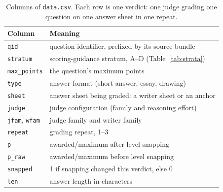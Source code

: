 \documentclass{article}
\begin{document}
\begin{table}[!ht]
\centering\small
\caption{Columns of \texttt{data.csv}. Each row is one verdict: one judge
grading one question on one answer sheet in one repeat.}
\label{tab:columns}
\begin{tabular}{@{}ll@{}}
\toprule
\textbf{Column} & \textbf{Meaning} \\
\midrule
\texttt{qid} & question identifier, prefixed by its source bundle \\
\texttt{stratum} & scoring-guidance stratum, A--D (Table~\ref{tab:strata}) \\
\texttt{max\_points} & the question's maximum points \\
\texttt{type} & answer format (short answer, essay, drawing) \\
\texttt{sheet} & answer sheet being graded: a writer sheet or an anchor \\
\texttt{judge} & judge configuration (family and reasoning effort) \\
\texttt{jfam}, \texttt{wfam} & judge family and writer family \\
\texttt{repeat} & grading repeat, 1--3 \\
\texttt{p} & awarded/maximum after level snapping \\
\texttt{p\_raw} & awarded/maximum before level snapping \\
\texttt{snapped} & 1 if snapping changed this verdict, else 0 \\
\texttt{len} & answer length in characters \\
\bottomrule
\end{tabular}
\end{table}
\end{document}
